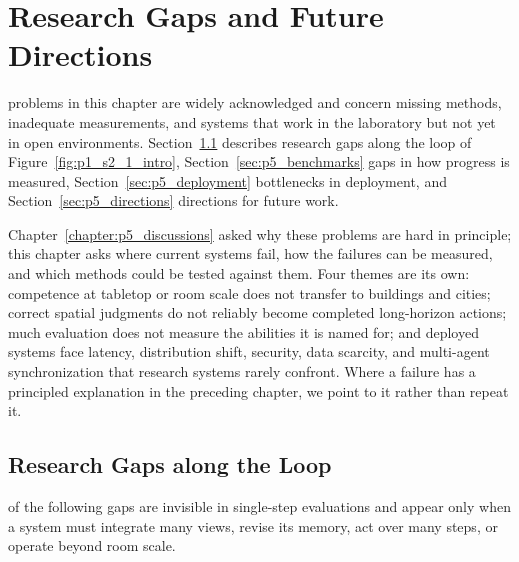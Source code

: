 \chapter{Research Gaps and Future Directions}
\label{chapter:p5_challenges}



 problems in this chapter are widely acknowledged and concern missing methods, inadequate measurements, and systems that work in the laboratory but not yet in open environments.
Section~\ref{sec:p5_gaps} describes research gaps along the loop of Figure~\ref{fig:p1_s2_1_intro}, Section~\ref{sec:p5_benchmarks} gaps in how progress is measured, Section~\ref{sec:p5_deployment} bottlenecks in deployment, and Section~\ref{sec:p5_directions} directions for future work.

Chapter~\ref{chapter:p5_discussions} asked why these problems are hard in principle; this chapter asks where current systems fail, how the failures can be measured, and which methods could be tested against them.
Four themes are its own: competence at tabletop or room scale does not transfer to buildings and cities; correct spatial judgments do not reliably become completed long-horizon actions; much evaluation does not measure the abilities it is named for; and deployed systems face latency, distribution shift, security, data scarcity, and multi-agent synchronization that research systems rarely confront.
Where a failure has a principled explanation in the preceding chapter, we point to it rather than repeat it.

\section{Research Gaps along the Loop}
\label{sec:p5_gaps}

 of the following gaps are invisible in single-step evaluations and appear only when a system must integrate many views, revise its memory, act over many steps, or operate beyond room scale.

